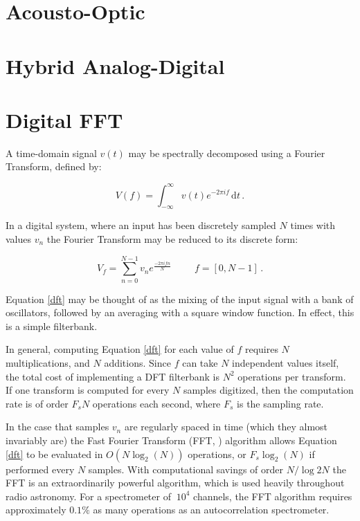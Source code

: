 \documentclass{article}
\begin{document}
\section{Acousto-Optic}\label{acousto-optic}

\section{Hybrid Analog-Digital}\label{hybrid-analog-digital}

\section{Digital FFT}\label{digital-fft}
A time-domain signal $v(t)$ may be spectrally decomposed using a Fourier Transform, defined by:

\begin{equation}
 \label{ft}
 V(f) = \int_{-\infty}^{\infty} v(t) e^{-2\pi i f} \,\mathrm{d}t\, .
\end{equation}

In a digital system, where an input has been discretely sampled $N$ times with values $v_n$ the Fourier Transform may be reduced to its discrete form: 

\begin{equation}
 \label{dft}
 V_f = \sum_{n = 0}^{N-1} v_n e^{\frac{-2\pi i f n}{N}} \hspace{1cm} f = [0, N-1]\,.
\end{equation}

Equation \ref{dft} may be thought of as the mixing of the input signal with a bank of oscillators, followed by an averaging with a square window function. In effect, this is a simple filterbank.

In general, computing Equation \ref{dft} for each value of $f$ requires $N$ multiplications, and $N$ additions. Since $f$ can take $N$ independent values itself, the total cost of implementing a DFT filterbank is $N^2$ operations per transform. If one transform is computed for every $N$ samples digitized, then the computation rate is of order $F_sN$ operations each second, where $F_s$ is the sampling rate.

In the case that samples $v_n$ are regularly spaced in time (which they almost invariably are) the Fast Fourier Transform (FFT, \cite{Cooley1965}) algorithm allows Equation \ref{dft} to be evaluated in $O(N\log_2(N))$ operations, or $F_s\log_2(N)$ if performed every $N$ samples. With computational savings of order $N / \log2{N}$ the FFT is an extraordinarily powerful algorithm, which is used heavily throughout radio astronomy. For a spectrometer of $~10^4$ channels, the FFT algorithm requires approximately $0.1\%$ as many operations as an autocorrelation spectrometer.
\end{document}

